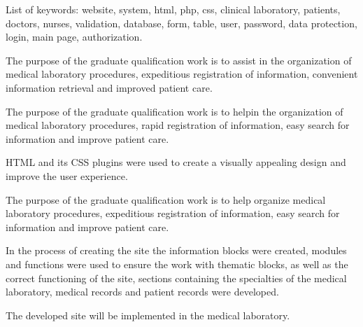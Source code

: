 List of keywords: website, system, html, php, css, clinical laboratory, patients, doctors, nurses, validation, database, form, table, user, password, data protection, login, main page, authorization.

The purpose of the graduate qualification work is to assist in the organization of medical laboratory procedures, expeditious registration of information, convenient information retrieval and improved patient care.

The purpose of the graduate qualification work is to help\linebreak in the organization of medical laboratory procedures, rapid registration of information, easy search for information and improve patient care.

HTML and its CSS plugins were used to create a visually appealing design and improve the user experience.

The purpose of the graduate qualification work is to help organize medical laboratory procedures, expeditious registration of information, easy search for information and improve patient care.

In the process of creating the site the information blocks were created, modules and functions were used to ensure the work with thematic blocks, as well as the correct functioning of the site, sections containing the specialties of the medical laboratory, medical records and patient records were developed.

The developed site will be implemented in the medical laboratory.
